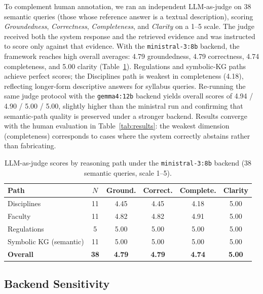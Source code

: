\documentclass[12pt]{article}
\begin{document}
To complement human annotation, we ran an independent LLM-as-judge on 38 semantic queries (those whose reference answer is a textual description), scoring \textit{Groundedness}, \textit{Correctness}, \textit{Completeness}, and \textit{Clarity} on a 1--5 scale. The judge received both the system response and the retrieved evidence and was instructed to score only against that evidence. With the \texttt{ministral-3:8b} backend, the framework reaches high overall averages: 4.79 groundedness, 4.79 correctness, 4.74 completeness, and 5.00 clarity (Table~\ref{tab:judge_path}). Regulations and symbolic-KG paths achieve perfect scores; the Disciplines path is weakest in completeness (4.18), reflecting longer-form descriptive answers for syllabus queries. Re-running the same judge protocol with the \texttt{gemma4:12b} backend yields overall scores of 4.94 / 4.90 / 5.00 / 5.00, slightly higher than the ministral run and confirming that semantic-path quality is preserved under a stronger backend. Results converge with the human evaluation in Table~\ref{tab:results}: the weakest dimension (completeness) corresponds to cases where the system correctly abstains rather than fabricating.

\begin{table}[ht]
\centering
\caption{LLM-as-judge scores by reasoning path under the \texttt{ministral-3:8b} backend (38 semantic queries, scale 1--5).}
\label{tab:judge_path}
\begin{tabular}{lccccc}
\hline
\textbf{Path} & \textbf{$N$} & \textbf{Ground.} & \textbf{Correct.} & \textbf{Complete.} & \textbf{Clarity} \\
\hline
Disciplines            & 11 & 4.45 & 4.45 & 4.18 & 5.00 \\
Faculty                & 11 & 4.82 & 4.82 & 4.91 & 5.00 \\
Regulations            & 5  & 5.00 & 5.00 & 5.00 & 5.00 \\
Symbolic KG (semantic) & 11 & 5.00 & 5.00 & 5.00 & 5.00 \\
\hline
\textbf{Overall}       & \textbf{38} & \textbf{4.79} & \textbf{4.79} & \textbf{4.74} & \textbf{5.00} \\
\hline
\end{tabular}
\end{table}


\subsection{Backend Sensitivity}
\end{document}
